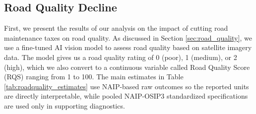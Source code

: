 

\subsection{Road Quality Decline} \label{sec:road_quality_decline}

 First, we present the results of our analysis on the impact of cutting road maintenance taxes on road quality. As discussed in Section \ref{sec:road_quality}, we use a fine-tuned AI vision model to assess road quality based on satellite imagery data. The model gives us a road quality rating of 0 (poor), 1 (medium), or 2 (high), which we also convert to a continuous variable called Road Quality Score (RQS) ranging from 1 to 100. The main estimates in Table \ref{tab:roadquality_estimates} use NAIP-based raw outcomes so the reported units are directly interpretable, while pooled NAIP-OSIP3 standardized specifications are used only in supporting diagnostics.

